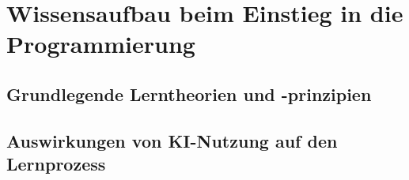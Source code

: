 \section{Wissensaufbau beim Einstieg in die Programmierung}

\subsection{Grundlegende Lerntheorien und -prinzipien}

\subsection{Auswirkungen von KI-Nutzung auf den Lernprozess}
